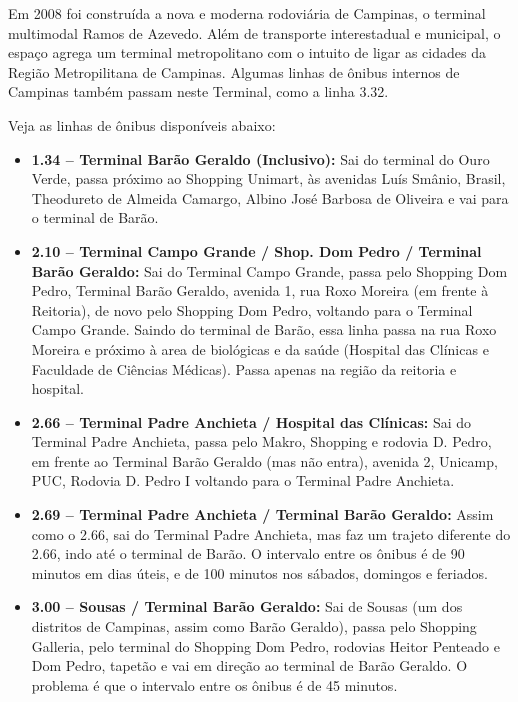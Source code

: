 Em 2008 foi construída a nova e moderna rodoviária de Campinas, o terminal
multimodal Ramos de Azevedo. Além de transporte interestadual e municipal,
o espaço agrega um terminal metropolitano com o intuito de ligar as cidades da
Região Metropilitana de Campinas. Algumas linhas de ônibus internos de Campinas
também passam neste Terminal, como a linha 3.32.

Veja as linhas de ônibus disponíveis abaixo:

\begin{itemize}

\item  \textbf{1.34 -- Terminal Barão Geraldo (Inclusivo):} Sai do terminal do
       Ouro Verde, passa próximo ao Shopping Unimart, às avenidas Luís Smânio,
       Brasil, Theodureto de Almeida Camargo, Albino José Barbosa de Oliveira e vai
       para o terminal de Barão.

\item  \textbf{2.10 -- Terminal Campo Grande / Shop. Dom Pedro / Terminal Barão
       Geraldo:} Sai do Terminal Campo Grande, passa pelo Shopping Dom Pedro,
       Terminal Barão Geraldo, avenida 1, rua Roxo Moreira (em frente à Reitoria),
       de novo pelo Shopping Dom Pedro, voltando para o Terminal Campo Grande.
       Saindo do terminal de Barão, essa linha passa na rua Roxo Moreira e próximo
       à area de biológicas e da saúde (Hospital das Clínicas e Faculdade de
       Ciências Médicas). Passa apenas na região da reitoria e hospital.

\item  \textbf{2.66 -- Terminal Padre Anchieta / Hospital das Clínicas:} Sai do
       Terminal Padre Anchieta, passa pelo Makro, Shopping e rodovia D. Pedro, em
       frente ao Terminal Barão Geraldo (mas não entra), avenida 2, Unicamp, PUC,
       Rodovia D. Pedro I voltando para o Terminal Padre Anchieta.

\item  \textbf{2.69 -- Terminal Padre Anchieta / Terminal Barão Geraldo:} Assim
       como o 2.66, sai do Terminal Padre Anchieta, mas faz um trajeto diferente do
       2.66, indo até o terminal de Barão. O intervalo entre os ônibus é de 90
       minutos em dias úteis, e de 100 minutos nos sábados, domingos e feriados.

\item  \textbf{3.00 -- Sousas / Terminal Barão Geraldo:} Sai de Sousas (um dos
       distritos de Campinas, assim como Barão Geraldo), passa pelo Shopping
       Galleria, pelo terminal do Shopping Dom Pedro, rodovias Heitor Penteado
       e Dom Pedro, tapetão e vai em direção ao terminal de Barão Geraldo.
       O problema é que o intervalo entre os ônibus é de 45 minutos.


\end{itemize}
